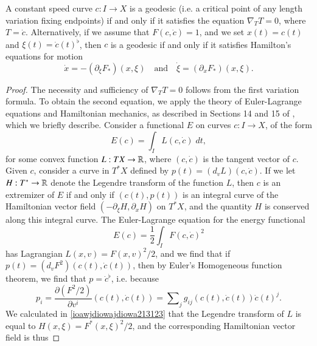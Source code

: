 \begin{corollary}
  A constant speed curve $c: I \to X$ is a geodesic (i.e. a critical point of any length variation fixing endpoints) if and only if it satisfies the equation $\nabla_T T = 0$, where $T = \dot{c}$.
  Alternatively, if we assume that $F(c,\dot{c}) = 1$, and we set $x(t) = c(t)$ and $\xi(t) = \dot{c}(t)^\flat$, then $c$ is a geodesic if and only if it satisfies Hamilton's equations for motion
  \[ \dot{x} = - (\partial_\xi F_*)(x,\xi) \quad\text{and}\quad \dot{\xi} = (\partial_x F_*)(x,\xi). \]

\end{corollary}
\begin{proof}
  The necessity and sufficiency of $\nabla_T T = 0$ follows from the first variation formula. To obtain the second equation, we apply the theory of Euler-Lagrange equations and Hamiltonian mechanics, as described in Sections 14 and 15 of \cite{Arnold}, which we briefly describe. Consider a functional $E$ on curves $c: I \to X$, of the form 
  \begin{equation} E(c) = \int_I L(c,\dot{c})\; dt, \end{equation}
  for some convex function $L: TX \to \operatorname{\mathbb{R}}$, where $(c,\dot{c})$ is the tangent vector of $c$. Given $c$, consider a curve in $T^*X$ defined by $p(t) = (d_v L)(c,\dot{c})$. If we let $H: T^* \to \operatorname{\mathbb{R}}$ denote the Legendre transform of the function $L$, then $c$ is an extremizer of $E$ if and only if $(c(t), p(t))$ is an integral curve of the Hamiltonian vector field $(-\partial_\xi H,  \partial_x H)$ on $T^* X$, and the quantity $H$ is conserved along this integral curve. The Euler-Lagrange equation for the energy functional
  \begin{equation}
    E(c) = \frac{1}{2} \int_I F(c,\dot{c})^2
  \end{equation}
  has Lagrangian $L(x,v) = F(x,v)^2/2$, and we find that if $p(t) = (d_v F^2)(c(t), \dot{c}(t))$, then by Euler's Homogeneous function theorem, we find that $p = \dot{c}^\flat$, i.e. because
  \begin{equation}
    p_i = \frac{\partial (F^2/2)}{\partial v^i}(c(t),\dot{c}(t)) = \sum\nolimits_j g_{ij}(c(t),\dot{c}(t)) \dot{c}(t)^j.
  \end{equation}
  We calculated in \eqref{ioawjdiowajdiowa213123} that the Legendre transform of $L$ is equal to $H(x,\xi) = F^*(x,\xi)^2 / 2$, and the corresponding Hamiltonian vector field is thus

\end{proof}
